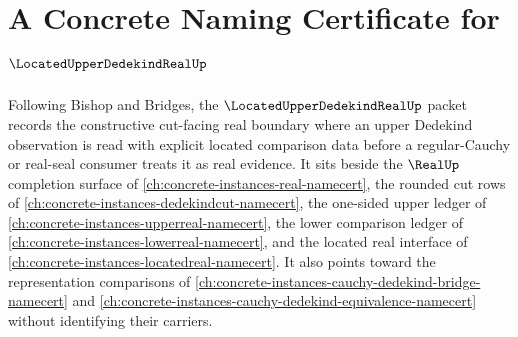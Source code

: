 \chapter{A Concrete Naming Certificate for $\LocatedUpperDedekindRealUp$}
\label{ch:concrete-instances-located-upper-dedekind-real-namecert}

Following Bishop and Bridges, the $\LocatedUpperDedekindRealUp$ packet records the constructive cut-facing real boundary where an upper Dedekind observation is read with explicit located comparison data before a regular-Cauchy or real-seal consumer treats it as real evidence. It sits beside the $\RealUp$ completion surface of \autoref{ch:concrete-instances-real-namecert}, the rounded cut rows of \autoref{ch:concrete-instances-dedekindcut-namecert}, the one-sided upper ledger of \autoref{ch:concrete-instances-upperreal-namecert}, the lower comparison ledger of \autoref{ch:concrete-instances-lowerreal-namecert}, and the located real interface of \autoref{ch:concrete-instances-locatedreal-namecert}. It also points toward the representation comparisons of \autoref{ch:concrete-instances-cauchy-dedekind-bridge-namecert} and \autoref{ch:concrete-instances-cauchy-dedekind-equivalence-namecert} without identifying their carriers.

